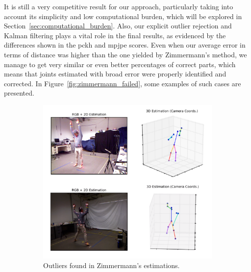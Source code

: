 It is still a very competitive result for our approach, particularly taking into account its simplicity and low computational burden, which will be explored in Section~\ref{sec:computational_burden}. Also, our explicit outlier rejection and Kalman filtering plays a vital role in the final results, as evidenced by the differences shown in the \gls{pckh} and \gls{mpjpe} scores. Even when our average error in terms of distance was higher than the one yielded by Zimmermann's method, we manage to get very similar or even better percentages of correct parts, which means that joints estimated with broad error were properly identified and corrected. In Figure~\ref{fig:zimmermann_failed}, some examples of such cases are presented.

\begin{figure}[h]\centering
    \begin{subfigure}{0.49\textwidth}\centering
        \includegraphics[width=\textwidth]{figures/zimmermann_failed.png} 
        \caption{Outliers found in Zimmermann's estimations.}
        \label{subfig:zimmermann_failed}
    \end{subfigure}
    \begin{subfigure}{0.49\textwidth}\centering

\end{subfigure}
\end{figure}
